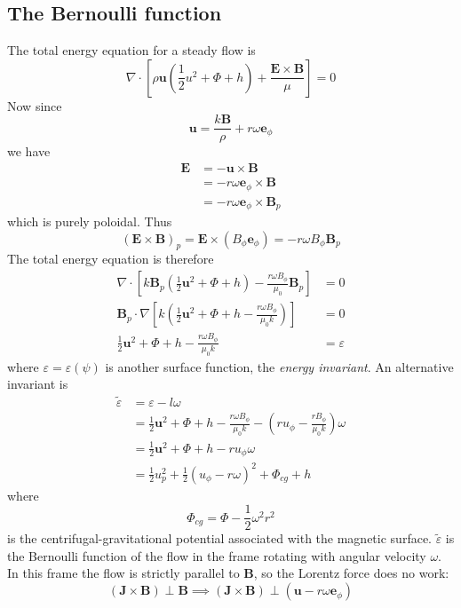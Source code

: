 \documentclass{jknotes}
\newcommand{\B}{\symbf{B}}
\renewcommand{\u}{\symbf{u}}
\newcommand{\veps}{\varepsilon}
\begin{document}
\subsection{The Bernoulli function}
The total energy equation for a steady flow is
\begin{equation}
	\nabla \cdot \left[ \rho \u(\frac{1}{2}u^2 + \Phi + h) +
	\frac{\symbf{E}\times\B}{\mu}\right] = 0
\end{equation}
Now since
\begin{equation}
	\u = \frac{k\B}{\rho} + r \omega \symbf{e}_\phi
\end{equation}
we have
\begin{align}
	\symbf{E} &= -\u \times \B \\
			  &= -r \omega \symbf{e}_\phi \times \B \\
			  &= -r\omega \symbf{e}_\phi \times \B_p
\end{align}
which is purely poloidal. Thus
\begin{equation}
	(\symbf{E}\times\B)_p = \symbf{E} \times (B_\phi \symbf{e}_\phi) =
	-r\omega B_\phi \B_p
\end{equation}
The total energy equation is therefore
\begin{align}
	\nabla \cdot \left[ k \B_p(\frac{1}{2}\u^2 + \Phi + h) - \frac{r\omega
	B_\phi}{\mu_0}\B_p\right] &= 0\\
	\B_p \cdot \nabla \left[ k\left(\frac{1}{2}\u^2 + \Phi + h -\frac{r\omega
	B_\phi}{\mu_0 k}\right)\right] &= 0\\
	\frac{1}{2}\u^2 + \Phi + h -\frac{r\omega B_\phi}{\mu_0 k} &= \veps 
\end{align}
where $\veps = \veps(\psi)$ is another surface function, the \emph{energy
invariant}. An alternative invariant is
\begin{align}
	\tilde{\veps} &= \veps - l\omega \\
				  &= \frac{1}{2}\u^2 + \Phi + h -\frac{r\omega B_\phi}{\mu_0
				  k} - \left(ru_\phi - \frac{rB_\phi}{\mu_0 k}\right)\omega \\
				  &= \frac{1}{2}\u^2 + \Phi + h - ru_\phi \omega \\
				  &= \frac{1}{2}u_p^2 + \frac{1}{2}(u_\phi - r\omega)^2 +
				  \Phi_{cg} + h
\end{align}
where
\begin{equation}
	\Phi_{cg} = \Phi - \frac{1}{2}\omega^2 r^2
\end{equation}
is the centrifugal-gravitational potential associated with the magnetic
surface. $\tilde{\veps}$ is the Bernoulli function of the flow in the frame
rotating with angular velocity $\omega$. In this frame the flow is strictly
parallel to $\B$, so the Lorentz force does no work:
\begin{equation}
	(\symbf{J}\times\B)\perp\B \implies (\symbf{J}\times\B)\perp(\u-r\omega
	\symbf{e}_\phi)
\end{equation}
\end{document}
